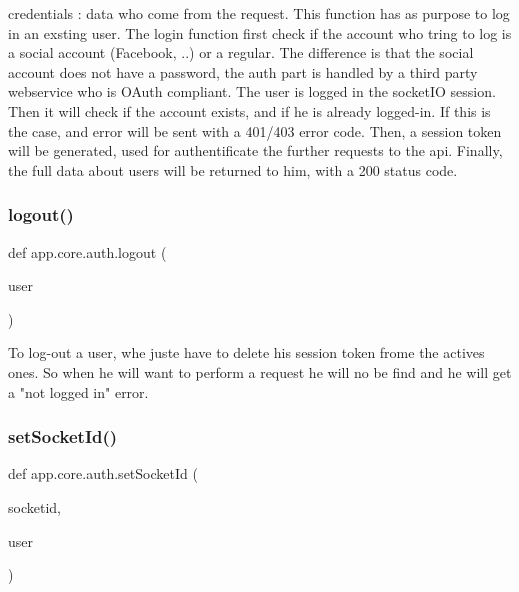 \begin{DoxyVerb}credentials : data who come from the request.
This function has as purpose to log in an exsting user.
The login function first check if the account who tring to log is a social account (Facebook, ..) or a regular.
The difference is that the social account does not have a password, the auth part is handled by a third party webservice who is OAuth compliant.
The user is logged in the socketIO session.
Then it will check if the account exists, and if he is already logged-in. If this is the case, and error will be sent with a 401/403 error code.
Then, a session token will be generated, used for authentificate the further requests to the api.
Finally, the full data about users will be returned to him, with a 200 status code.
\end{DoxyVerb}
 \mbox{\label{namespaceapp_1_1core_1_1auth_ae87863230b51e980badace5e2df98f9b}} 
\subsubsection{\texorpdfstring{logout()}{logout()}}
{\footnotesize\ttfamily def app.\+core.\+auth.\+logout (\begin{DoxyParamCaption}\item[{}]{user }\end{DoxyParamCaption})}

\begin{DoxyVerb}To log-out a user, whe juste have to delete his session token frome the actives ones.
So when he will want to perform a request he will no be find and he will get a "not logged in" error.
\end{DoxyVerb}
 \mbox{\label{namespaceapp_1_1core_1_1auth_a218d3eabbf4a3f1be7f409dfd2bd2be4}} 
\subsubsection{\texorpdfstring{set\+Socket\+Id()}{setSocketId()}}
{\footnotesize\ttfamily def app.\+core.\+auth.\+set\+Socket\+Id (\begin{DoxyParamCaption}\item[{}]{socketid,  }\item[{}]{user }\end{DoxyParamCaption})}

